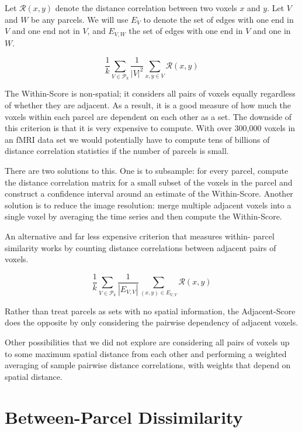 Let $\mathcal{R}(x,y)$ denote the distance correlation between two
voxels $x$ and $y$.
Let $V$ and $W$ be any parcels. We will use $E_V$ to denote the set of edges with one end in $V$ and one end not in $V$, and $E_{V,W}$ the set
of edges with one end in $V$ and one in $W$.

\begin{definition} \label{within-score}
\[ \frac{1}{k} \sum_{V \in \mathcal{P}_k}
   \frac{1}{|V|^2} \sum_{x,y \in V} \mathcal{R}(x,y)
\]
\end{definition}

The Within-Score is non-spatial; it considers all pairs of voxels
equally regardless of whether they are adjacent. As a result, it is a
good measure of how much the voxels within each parcel are dependent on
each other as a set. The downside of this criterion is that it is very
expensive to compute. With over 300,000 voxels in an fMRI data set we
would potentially have to compute tens of billions of distance
correlation statistics if the number of parcels is small.

There are two solutions to this. One is to subsample: for every parcel,
compute the distance correlation matrix for a small subset of the voxels
in the parcel and construct a confidence interval around an estimate of
the Within-Score. Another solution is to reduce the image resolution:
merge multiple adjacent voxels into a single voxel by averaging the time
series and then compute the Within-Score.

An alternative and far less expensive criterion that measures within-
parcel similarity works by counting distance correlations between
adjacent pairs of voxels.

\begin{definition} \label{adjacent-score}
\[ \frac{1}{k} \sum_{V \in \mathcal{P}_k}
   \frac{1}{|E_{V,V}|} \sum_{(x,y) \in E_{V,V}} \mathcal{R}(x,y)
\]
\end{definition}

Rather than treat parcels as sets with no spatial information, the
Adjacent-Score does the opposite by only considering the pairwise
dependency of adjacent voxels.

Other possibilities that we did not explore are considering all pairs
of voxels up to some maximum spatial distance from each other and
performing a weighted averaging of sample pairwise distance
correlations, with weights that depend on spatial distance.

\section{Between-Parcel Dissimilarity}

